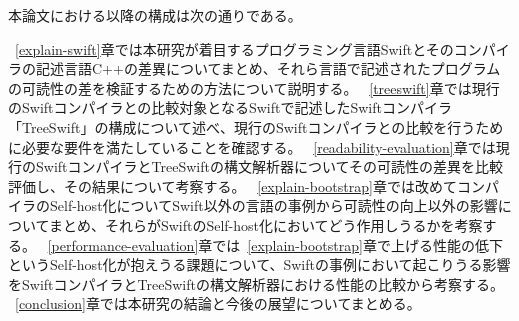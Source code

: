 本論文における以降の構成は次の通りである。

~\ref{explain-swift}章では本研究が着目するプログラミング言語Swiftとそのコンパイラの記述言語C++の差異についてまとめ、それら言語で記述されたプログラムの可読性の差を検証するための方法について説明する。
~\ref{treeswift}章では現行のSwiftコンパイラとの比較対象となるSwiftで記述したSwiftコンパイラ「TreeSwift」の構成について述べ、現行のSwiftコンパイラとの比較を行うために必要な要件を満たしていることを確認する。
~\ref{readability-evaluation}章では現行のSwiftコンパイラとTreeSwiftの構文解析器についてその可読性の差異を比較評価し、その結果について考察する。
~\ref{explain-bootstrap}章では改めてコンパイラのSelf-host化についてSwift以外の言語の事例から可読性の向上以外の影響についてまとめ、それらがSwiftのSelf-host化においてどう作用しうるかを考察する。
~\ref{performance-evaluation}章では~\ref{explain-bootstrap}章で上げる性能の低下というSelf-host化が抱えうる課題について、Swiftの事例において起こりうる影響をSwiftコンパイラとTreeSwiftの構文解析器における性能の比較から考察する。
~\ref{conclusion}章では本研究の結論と今後の展望についてまとめる。

